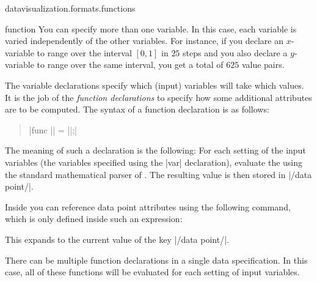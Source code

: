 \begin{tikzlibrary}{datavisualization.formats.functions}
\begin{dataformat}{function}
    You can specify more than one variable. In this case, each
    variable is varied independently of the other variables. For
    instance, if you declare an $x$-variable to range over the
    interval $[0,1]$ in $25$ steps and you also declare a $y$-variable
    to range over the same interval, you get a total of $625$ value
    pairs.

    The variable declarations specify which (input) variables will
    take which values. It is the job of the \emph{function
      declarations} to specify how some additional attributes are to
    be computed. The syntax of a function declaration is as follows:
    \begin{quote}
      |func || = ||;|
    \end{quote}
    The meaning of such a declaration is the following: For each
    setting of the input variables (the variables specified using the
    |var| declaration), evaluate the  using the
    standard mathematical parser of \tikzname. The resulting value is
    then stored in |/data point/|.

    Inside  you can reference data point attributes
    using the following command, which is only defined inside such an
    expression:
    \begin{command}{\value{}}
      This expands to the current value of the key |/data point/|.
    \end{command}

    There can be multiple function declarations in a single data
    specification. In this case, all of these functions will be
    evaluated for each setting of input variables.

    \begin{codeexample}[]
    \end{codeexample}
    \begin{codeexample}[]
    \end{codeexample}
  \end{dataformat}

\end{tikzlibrary}



